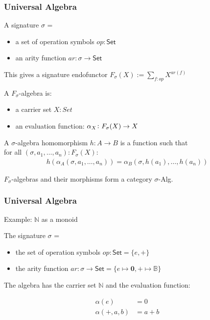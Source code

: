 \documentclass[9pt]{beamer}
\begin{document}
\begin{frame}
\frametitle{Universal Algebra}
A signature $\sigma$ =
\begin{itemize}
    \item a set of operation symbols $op : \mathsf{Set}$
    \item an arity function $ar : \sigma \rightarrow \mathsf{Set}$
\end{itemize}

This gives a signature endofunctor $F_{\sigma}(X) := \sum_{f : op} X^{ar(f)}$

A $F_{\sigma}$-algebra is:
\begin{itemize}
    \item a carrier set $X : Set$
    \item an evaluation function: $\alpha_X\colon\Sig(X) \to X$
\end{itemize}

A $\sigma$-algebra homomorphism $h: A \rightarrow B$ is a function such that \\
for all $(\sigma, a_1, \dots, a_n) : F_{\sigma}(X)$:
\begin{align*}
    h(\alpha_A(\sigma, a_1, \dots, a_n)) = \alpha_B(\sigma, h(a_1), \dots, h(a_n))
\end{align*}

$F_{\sigma}$-algebras and their morphisms form a category $\sigma$-Alg.

\end{frame}

\begin{frame}
\frametitle{Universal Algebra}
Example: $\mathbb{N}$ as a monoid

The signature $\sigma$ =
\begin{itemize}
    \item the set of operation symbols $op : \mathsf{Set} = \{e, +\}$
    \item the arity function $ar : \sigma \rightarrow \mathsf{Set} = \{e \mapsto \mathbf{0}, + \mapsto \mathbb{B}\}$
\end{itemize}

The algebra has the carrier set $\mathbb{N}$ and the evaluation function:

\begin{align*}
\alpha(e) & = 0 \\
\alpha(+, a, b) & = a + b 
\end{align*} 


\end{frame}
\end{document}
